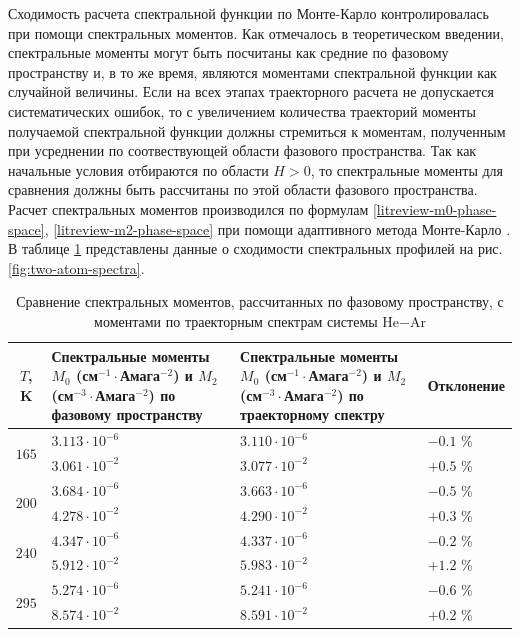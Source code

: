 Сходимость расчета спектральной функции по Монте-Карло контролировалась при помощи спектральных моментов. Как отмечалось в теоретическом введении, спектральные моменты могут быть посчитаны как средние по фазовому пространству и, в то же время, являются моментами спектральной функции как случайной величины. Если на всех этапах траекторного расчета не допускается систематических ошибок, то с увеличением количества траекторий моменты получаемой спектральной функции должны стремиться к моментам, полученным при усреднении по соотвествующей области фазового пространства. Так как начальные условия отбираются по области $H > 0$, то спектральные моменты для сравнения должны быть рассчитаны по этой области фазового пространства. Расчет спектральных моментов производился по формулам \eqref{litreview-m0-phase-space}, \eqref{litreview-m2-phase-space}  при помощи адаптивного метода Монте-Карло \cite{hep}. В таблице \ref{table:hear-moments} представлены данные о сходимости спектральных профилей на рис. \ref{fig:two-atom-spectra}. 

\begin{table}[H]
    \begin{tabular}{c >{\centering}p{6cm} >{\centering}p{6cm} >{\centering}p{3cm}}
        \toprule
        $T$, K & Спектральные моменты $M_0$ (см$^{-1} \cdot$Амага$^{-2}$) и $M_2$ (см$^{-3} \cdot$Амага$^{-2}$) по фазовому пространству & Спектральные моменты $M_0$ (см$^{-1} \cdot$Амага$^{-2}$) и $M_2$ (см$^{-3} \cdot$Амага$^{-2}$) по траекторному спектру & Отклонение \tabularnewline
        \midrule
        \multirow{2}{*}{$165$}  & $3.113\cdot 10^{-6}$ & $3.110 \cdot 10^{-6}$ & $-0.1$ \%  \tabularnewline
                                & $3.061\cdot 10^{-2}$ & $3.077 \cdot 10^{-2}$ & $+0.5$ \%  \tabularnewline
        \midrule
        \multirow{2}{*}{$200$}  & $3.684\cdot 10^{-6}$ & $3.663 \cdot 10^{-6}$ & $-0.5$ \%  \tabularnewline
                                & $4.278\cdot 10^{-2}$ & $4.290 \cdot 10^{-2}$ & $+0.3$ \%  \tabularnewline
        \midrule
        \multirow{2}{*}{$240$}  & $4.347\cdot 10^{-6}$ & $4.337 \cdot 10^{-6}$ & $-0.2$ \%  \tabularnewline
                                & $5.912\cdot 10^{-2}$ & $5.983 \cdot 10^{-2}$ & $+1.2$ \%  \tabularnewline
        \midrule
        \multirow{2}{*}{$295$}  & $5.274\cdot 10^{-6}$ & $5.241 \cdot 10^{-6}$ & $-0.6$ \%  \tabularnewline
                                & $8.574\cdot 10^{-2}$ & $8.591 \cdot 10^{-2}$ & $+0.2$ \%  \tabularnewline
        \bottomrule
    \end{tabular}
    \caption{Сравнение спектральных моментов, рассчитанных по фазовому пространству, с моментами по траекторным спектрам системы He$-$Ar}
    \label{table:hear-moments}
\end{table}


